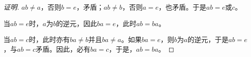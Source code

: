 \documentclass{article}
\begin{document}
\begin{CJK*}{UTF8}{gbsn}
\begin{proof}[证明]
$ab\neq a$，否则$b=e$，矛盾；$ab\neq b$，否则$a=e$，也矛盾。于是$ab=e$或$c$。

当$ab=e$时，$a$为$b$的逆元，因此$ba=e$，此时$ab=ba$。

当$ab=c$时，此时亦有$ba\neq b$并且$ba\neq a$。如果$ba=e$，则$b$为$a$的逆元，于是$ab=e$，与$ab=c$矛盾。因此，必有$ba=c$，于是，$ab=ba$。






\end{proof}
\end{CJK*}
\end{document}
